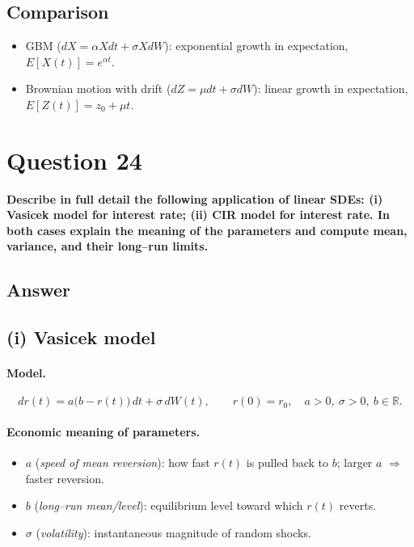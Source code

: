 \documentclass[12pt,a4paper]{book}
\theoremstyle{remark}
\begin{document}
\subsection*{Comparison}
\begin{itemize}
    \item GBM ($dX=\alpha X dt + \sigma X dW$): exponential growth in expectation, $E[X(t)] = e^{\alpha t}$.
    \item Brownian motion with drift ($dZ=\mu dt + \sigma dW$): linear growth in expectation, $E[Z(t)] = z_0 + \mu t$.
\end{itemize}













\newpage
\section{Question 24}
\textbf{Describe in full detail the following application of linear SDEs:
(i) Vasicek model for interest rate; (ii) CIR model for interest rate.
In both cases explain the meaning of the parameters and compute mean, variance, and their long–run limits.}

\subsection*{Answer}

\subsection*{(i) Vasicek model}
\paragraph{Model.}
\[
dr(t)=a\bigl(b-r(t)\bigr)\,dt+\sigma\,dW(t),\qquad r(0)=r_0,\quad a>0,\ \sigma>0,\ b\in\mathbb{R}.
\]

\paragraph{Economic meaning of parameters.}
\begin{itemize}
  \item $a$ (\emph{speed of mean reversion}): how fast $r(t)$ is pulled back to $b$; larger $a$ $\Rightarrow$ faster reversion.
  \item $b$ (\emph{long–run mean/level}): equilibrium level toward which $r(t)$ reverts.
  \item $\sigma$ (\emph{volatility}): instantaneous magnitude of random shocks.
\end{itemize}
\end{document}
